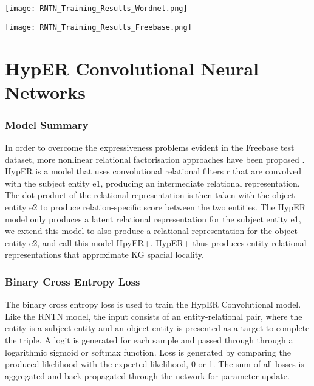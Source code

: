 \begin{center}
    \texttt{[image: RNTN\_Training\_Results\_Wordnet.png]}
\end{center}

\begin{center}
    \texttt{[image: RNTN\_Training\_Results\_Freebase.png]}
\end{center}

\section{HypER Convolutional Neural Networks}

\subsubsection{Model Summary} 
In order to overcome the expressiveness problems evident in the Freebase test dataset, more nonlinear relational factorisation approaches have been proposed \cite{ComplEx, Neural LP, TorusE}. \newline
HypER is a model that uses convolutional relational filters r that are convolved with the subject entity e1, producing an intermediate relational representation. The dot product of the relational representation is then taken with the object entity e2 to produce relation-specific score between the two entities. The HypER model only produces a latent relational representation for the subject entity e1, we extend this model to also produce a relational representation for the object entity e2, and call this model HpyER+. HypER+ thus produces entity-relational representations that approximate KG spacial locality. \newline
\subsubsection{Binary Cross Entropy Loss}
The binary cross entropy loss \cite{reference} is used to train the HypER Convolutional model. Like the RNTN model, the input consists of an entity-relational pair, where the entity is a subject entity and an object entity is presented as a target to complete the triple. A logit is generated for each sample and passed through through a logarithmic sigmoid or softmax function. Loss is generated by comparing the produced likelihood with the expected likelihood, 0 or 1. The sum of all losses is aggregated and back propagated through the network for parameter update. \newline


